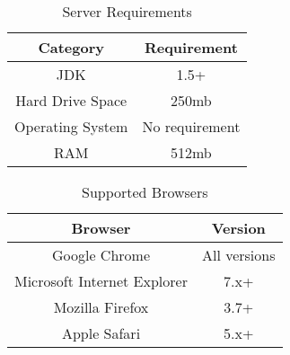 \documentclass{article}
\begin{document}
\begin{table}
    \centering
    \begin{tabular}{|c|c|}\hline
        Category & Requirement \\\hline\hline
        JDK & 1.5+ \\\hline
        Hard Drive Space & 250mb \\\hline
        Operating System & No requirement \\\hline
        RAM & 512mb \\\hline
    \end{tabular}
    \caption{Server Requirements}
    \label{server}
\end{table}

\begin{table}
    \centering
    \begin{tabular}{|c|c|}\hline
        Browser & Version \\\hline\hline
        Google Chrome & All versions  \\\hline
        Microsoft Internet Explorer & 7.x+ \\\hline
        Mozilla Firefox & 3.7+ \\\hline
        Apple Safari & 5.x+ \\\hline
    \end{tabular}
    \caption{Supported Browsers}
    \label{browsers}
\end{table}
\end{document}
